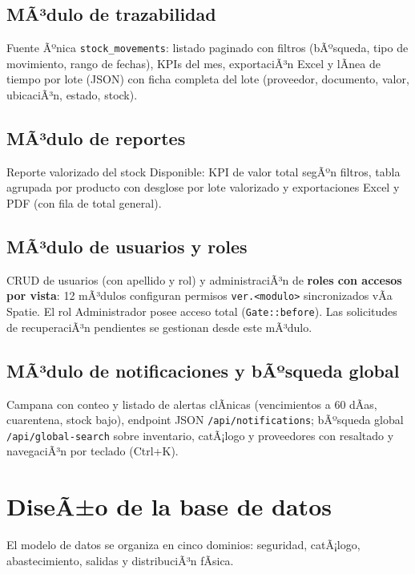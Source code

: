 ﻿\documentclass[a4paper, 12pt]{article}
\begin{document}
\subsection{MÃ³dulo de trazabilidad}
Fuente Ãºnica \texttt{stock\_movements}: listado paginado con filtros (bÃºsqueda, tipo de movimiento, rango de fechas), KPIs del mes, exportaciÃ³n Excel y lÃ­nea de tiempo por lote (JSON) con ficha completa del lote (proveedor, documento, valor, ubicaciÃ³n, estado, stock).

\subsection{MÃ³dulo de reportes}
Reporte valorizado del stock Disponible: KPI de valor total segÃºn filtros, tabla agrupada por producto con desglose por lote valorizado y exportaciones Excel y PDF (con fila de total general).

\subsection{MÃ³dulo de usuarios y roles}
CRUD de usuarios (con apellido y rol) y administraciÃ³n de \textbf{roles con accesos por vista}: 12 mÃ³dulos configuran permisos \texttt{ver.<modulo>} sincronizados vÃ­a Spatie. El rol Administrador posee acceso total (\texttt{Gate::before}). Las solicitudes de recuperaciÃ³n pendientes se gestionan desde este mÃ³dulo.

\subsection{MÃ³dulo de notificaciones y bÃºsqueda global}
Campana con conteo y listado de alertas clÃ­nicas (vencimientos a 60 dÃ­as, cuarentena, stock bajo), endpoint JSON \texttt{/api/notifications}; bÃºsqueda global \texttt{/api/global-search} sobre inventario, catÃ¡logo y proveedores con resaltado y navegaciÃ³n por teclado (Ctrl+K).

\section{DiseÃ±o de la base de datos}

El modelo de datos se organiza en cinco dominios: seguridad, catÃ¡logo, abastecimiento, salidas y distribuciÃ³n fÃ­sica.
\end{document}
